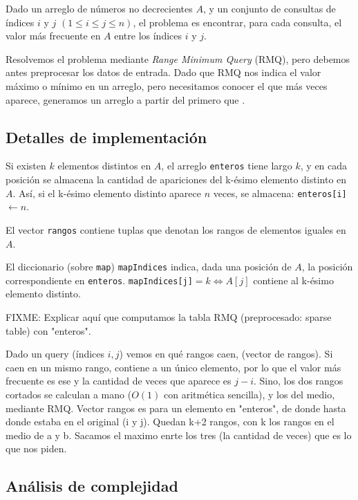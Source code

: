 Dado un arreglo de números no decrecientes $A$, y un conjunto de consultas de
índices $i$ y $j$ $(1 \le i \le j \le n)$, el problema es encontrar, para cada
consulta, el valor más frecuente en $A$ entre los índices $i$ y $j$.

Resolvemos el problema mediante {\sl Range Minimum Query} (RMQ), pero debemos
antes preprocesar los datos de entrada. Dado que RMQ nos indica el valor máximo
o mínimo en un arreglo, pero necesitamos conocer el que más veces aparece,
generamos un arreglo a partir del primero que .


\subsection*{Detalles de implementación}

Si existen $k$ elementos distintos en $A$, el arreglo {\tt enteros} tiene largo
$k$, y en cada posición se almacena la cantidad de apariciones del k-ésimo
elemento distinto en $A$. Así, si el k-ésimo elemento distinto aparece $n$
veces, se almacena: {\tt enteros[i]}$\gets n$.

El vector {\tt rangos} contiene tuplas que denotan los rangos de elementos iguales en $A$.

El diccionario (sobre {\tt map}) {\tt mapIndices} indica, dada una posición de
$A$, la posición correspondiente en {\tt enteros}. {\tt mapIndices[j]}$=k
\Leftrightarrow A[j]$ contiene al k-ésimo elemento distinto.

FIXME: Explicar aquí que computamos la tabla RMQ (preprocesado: sparse table) con "enteros".

Dado un query (índices $i,j$) vemos en qué rangos caen,
(vector de rangos). Si caen en un mismo rango, contiene a un único elemento,
por lo que el valor más frecuente es ese y la cantidad de veces que aparece es
$j-i$. Sino, los dos rangos cortados se calculan a
mano ($O(1)$ con aritmética sencilla), y los del medio, mediante RMQ.
Vector rangos es para un elemento en "enteros", de donde hasta donde estaba
en el original (i y j). Quedan k+2 rangos, con k los rangos en el medio de a y
b. Sacamos el maximo enrte los tres (la cantidad de veces) que es lo que nos
piden.

\subsection*{Análisis de complejidad}

